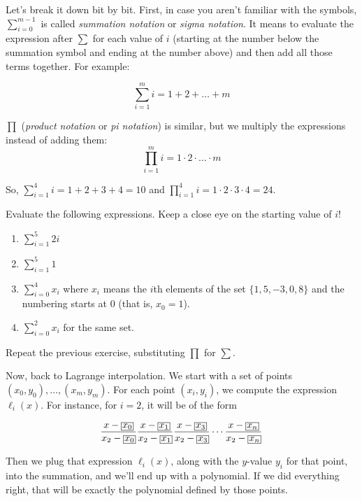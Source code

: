 Let's break it down bit by bit. First, in case you aren't familiar with 
the symbols, $\sum_{i=0}^{m-1}$ is called \emph{summation notation} 
or \emph{sigma notation}. It means to evaluate the expression after 
$\sum$ for each value of $i$ (starting at the number below the summation 
symbol and ending at the number above) and then add all those terms together. For 
example:

\[
    \sum_{i=1}^m i = 1 + 2 + \ldots + m
\]

$\prod$ (\emph{product notation} or \emph{pi notation}) is similar, but we multiply the expressions instead of adding 
them:
\[
    \prod_{i=1}^m i = 1 \cdot 2 \cdot \ldots \cdot m
\]

So, $\sum_{i=1}^{4} i = 1+2+3+4 = 10$ and $\prod_{i=1}^4 i = 1 \cdot 2 \cdot 3 
\cdot 4 = 24$.

\begin{bonus}
    Evaluate the following expressions. Keep a close eye on the starting 
    value of $i$!
    \renewcommand{\labelenumi}{(\alph{enumi})} 
    \begin{enumerate}
        \item $\sum_{i=1}^5 2i$
        \item $\sum_{i=1}^5 1$
        \item $\sum_{i=0}^4 x_i$ where $x_i$ means the $i$th 
        elements of the set $\{1, 5, -3, 0, 8\}$ and the numbering
        starts at 0 (that is, $x_0=1$).
        \item $\sum_{i=0}^2 x_i$ for the same set.
    \end{enumerate}
\end{bonus}

\begin{bonus}
    Repeat the previous exercise, substituting $\prod$ for $\sum$.
\end{bonus}

Now, back to Lagrange interpolation. We start with a set of points $(x_0, y_0), 
\ldots,\allowbreak (x_m, y_m)$. For each point $(x_i, y_i)$, we compute the 
expression $\ell_i(x)$. For instance, for $i=2$, it will be of the form

\newcommand{\cyan}[1]{\textcolor{cyan}{#1}}
\[
    \setlength{\fboxsep}{.3\fboxsep}
    \frac{x-\boxed{x_0}}{x_2-\boxed{x_0}}
    \frac{x-\boxed{x_1}}{x_2-\boxed{x_1}}
    \frac{x-\boxed{x_3}}{x_2-\boxed{x_3}}
    \cdots
    \frac{x-\boxed{x_n}}{x_2-\boxed{x_n}}
\]

Then we plug that expression $\ell_i(x)$, along with the $y$-value $y_i$ 
for that point, into the summation, and we'll end up with a polynomial. 
If we did everything right, that will be exactly the polynomial defined 
by those points.

